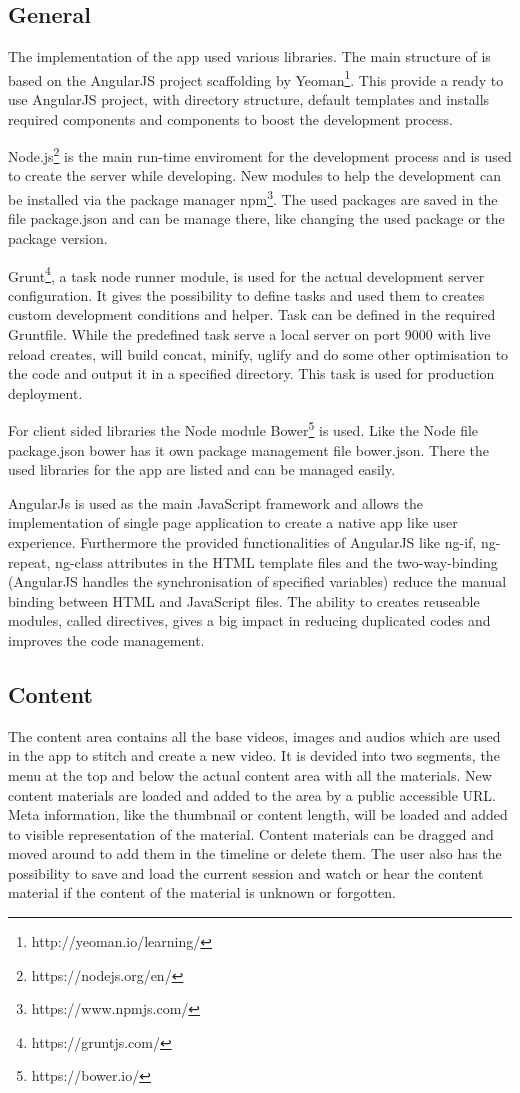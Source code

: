 \documentclass[conference]{IEEEtran}
\begin{document}
\subsection{General}
The implementation of the app used various libraries. The main structure of is based on the AngularJS project scaffolding by Yeoman\footnote{http://yeoman.io/learning/}. This provide a ready to use AngularJS project, with directory structure, default templates and installs required components and components to boost the development process. 

Node.js\footnote{https://nodejs.org/en/} is the main run-time enviroment for the development process and is used to create the server while developing. New modules to help the development can be installed via the package manager npm\footnote{https://www.npmjs.com/}. The used packages are saved in the file package.json and can be manage there, like changing the used package or the package version.

Grunt\footnote{https://gruntjs.com/}, a task node runner module, is used for the actual development server configuration. It gives the possibility to define tasks and used them to creates custom development conditions and helper. Task can be defined in the required Gruntfile. While the predefined task serve a local server on port 9000 with live reload creates, will build concat, minify, uglify and do some other optimisation to the code and output it in a specified directory. This task is used for production deployment.

For client sided libraries the Node module Bower\footnote{https://bower.io/} is used. Like the Node file package.json bower has it own package management file bower.json. There the used libraries for the app are listed and can be managed easily. 

AngularJs is used as the main JavaScript framework and allows the implementation of single page application to create a native app like user experience. Furthermore the provided functionalities of AngularJS like ng-if, ng-repeat, ng-class attributes in the HTML template files and the two-way-binding (AngularJS handles the synchronisation of specified variables) reduce the manual binding between HTML and JavaScript files. The ability to creates reuseable modules, called directives, gives a big impact in reducing duplicated codes and improves the code management.

\subsection{Content}
The content area contains all the base videos, images and audios which are used in the app to stitch and create a new video. It is devided into two segments, the menu at the top and below the actual content area with all the materials. New content materials are loaded and added to the area by a public accessible URL. Meta information, like the thumbnail or content length, will be loaded and added to visible representation of the material. Content materials can be dragged and moved around to add them in the timeline or delete them. The user also has the possibility to save and load the current session and watch or hear the content material if the content of the material is unknown or forgotten.
\end{document}
